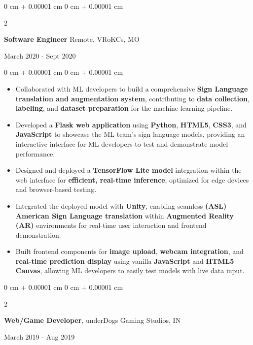 \documentclass[10pt, letterpaper]{article}
\newenvironment{highlights}{
    \begin{itemize}[
        topsep=0.10 cm,
        parsep=0.10 cm,
        partopsep=0pt,
        itemsep=0pt,
        leftmargin=0 cm + 10pt
    ]
}{
    \end{itemize}
} %
\newenvironment{onecolentry}{
    \begin{adjustwidth}{
        0 cm + 0.00001 cm
    }{
        0 cm + 0.00001 cm
    }
}{
    \end{adjustwidth}
} %
\newenvironment{twocolentry}[2][]{
    \onecolentry
    \def\secondColumn{#2}
    \setcolumnwidth{\fill, 4.5 cm}
    \begin{paracol}{2}
}{
    \switchcolumn \raggedleft \secondColumn
    \end{paracol}
    \endonecolentry
} %
\begin{document}
\vspace{0.15 cm}
\begin{twocolentry}{
		March 2020 - Sept 2020
	}
	\textbf{Software Engineer} Remote, VRoKCs, MO
\end{twocolentry}
\begin{onecolentry}
	\begin{highlights}
		\item Collaborated with ML developers to build a comprehensive \textbf{Sign Language translation and augmentation system}, contributing to \textbf{data collection}, \textbf{labeling}, and \textbf{dataset preparation} for the machine learning pipeline.
		\item Developed a \textbf{Flask web application} using \textbf{Python}, \textbf{HTML5}, \textbf{CSS3}, and \textbf{JavaScript} to showcase the ML team's sign language models, providing an interactive interface for ML developers to test and demonstrate model performance.
		\item Designed and deployed a \textbf{TensorFlow Lite model} integration within the web interface for \textbf{efficient, real-time inference}, optimized for edge devices and browser-based testing.
		\item Integrated the deployed model with \textbf{Unity}, enabling seamless \textbf{(ASL) American Sign Language translation} within \textbf{Augmented Reality (AR)} environments for real-time user interaction and frontend demonstration.
		\item Built frontend components for \textbf{image upload}, \textbf{webcam integration}, and \textbf{real-time prediction display} using vanilla \textbf{JavaScript} and \textbf{HTML5 Canvas}, allowing ML developers to easily test models with live data input.
	\end{highlights}
\end{onecolentry}




\vspace{0.15 cm}
\begin{twocolentry}{
		March 2019 - Aug 2019
	}
	\textbf{Web/Game Developer}, underDogs Gaming Studios, IN
\end{twocolentry}
\end{document}
